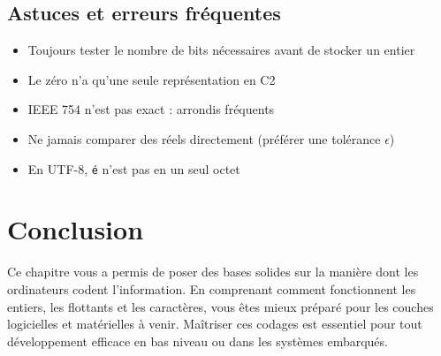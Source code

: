 \documentclass[12pt,a4paper]{article}
\begin{document}
\subsection{Astuces et erreurs fréquentes}
\begin{itemize}
  \item Toujours tester le nombre de bits nécessaires avant de stocker un entier
  \item Le zéro n’a qu’une seule représentation en C2
  \item IEEE 754 n’est pas exact : arrondis fréquents
  \item Ne jamais comparer des réels directement (préférer une tolérance $\epsilon$)
  \item En UTF-8, \texttt{é} n’est pas en un seul octet
\end{itemize}

\section{Conclusion}
Ce chapitre vous a permis de poser des bases solides sur la manière dont les ordinateurs codent l’information. En comprenant comment fonctionnent les entiers, les flottants et les caractères, vous êtes mieux préparé pour les couches logicielles et matérielles à venir. Maîtriser ces codages est essentiel pour tout développement efficace en bas niveau ou dans les systèmes embarqués.
\end{document}
